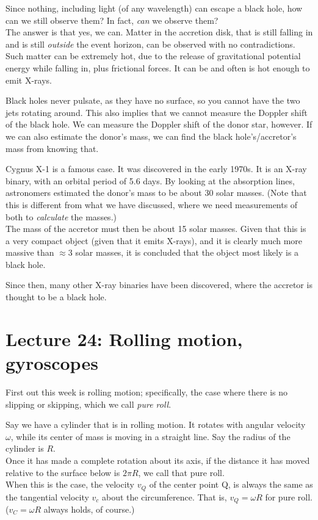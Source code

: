 Since nothing, including light (of any wavelength) can escape a black hole, how can we still observe them? In fact, \emph{can} we observe them?\\
The answer is that yes, we can. Matter in the accretion disk, that is still falling in and is still \emph{outside} the event horizon, can be observed with no contradictions. Such matter can be extremely hot, due to the release of gravitational potential energy while falling in, plus frictional forces. It can be and often is hot enough to emit X-rays.

Black holes never pulsate, as they have no surface, so you cannot have the two jets rotating around. This also implies that we cannot measure the Doppler shift of the black hole. We can measure the Doppler shift of the donor star, however. If we can also estimate the donor's mass, we can find the black hole's/accretor's mass from knowing that.

Cygnus X-1 is a famous case. It was discovered in the early 1970s. It is an X-ray binary, with an orbital period of 5.6 days. By looking at the absorption lines, astronomers estimated the donor's mass to be about 30 solar masses. (Note that this is different from what we have discussed, where we need measurements of both to \emph{calculate} the masses.)\\
The mass of the accretor must then be about 15 solar masses. Given that this is a very compact object (given that it emits X-rays), and it is clearly much more massive than $\approx 3$ solar masses, it is concluded that the object most likely is a black hole.

Since then, many other X-ray binaries have been discovered, where the accretor is thought to be a black hole.

\section{Lecture 24: Rolling motion, gyroscopes}

First out this week is rolling motion; specifically, the case where there is no slipping or skipping, which we call \emph{pure roll}.

Say we have a cylinder that is in rolling motion. It rotates with angular velocity $\omega$, while its center of mass is moving in a straight line. Say the radius of the cylinder is $R$.\\
Once it has made a complete rotation about its axis, if the distance it has moved relative to the surface below is $2 \pi R$, we call that pure roll.\\
When this is the case, the velocity $v_Q$ of the center point Q, is always the same as the tangential velocity $v_c$ about the circumference. That is, $v_Q = \omega R$ for pure roll. ($v_C = \omega R$ always holds, of course.)

